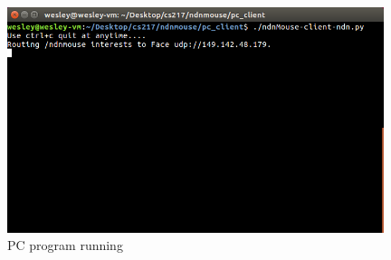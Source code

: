 \documentclass{sig-alternate}
\renewcommand\_{\textunderscore\allowbreak}  %
\begin{document}
\begin{figure}[ht]
	\hypertarget{fig:client3}{}
	\centering
	\caption{PC program running}
	\includegraphics[width=11cm]{screenshots/client3}
\end{figure}
\end{document}
